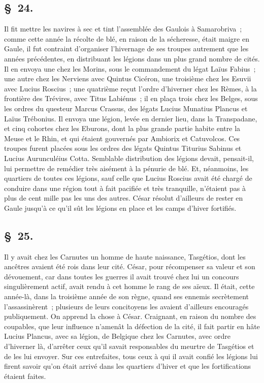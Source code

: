 \documentclass[french,twoside]{book} %
\begin{document}
\subsection[{§ 24.}]{ \textsc{§ 24.} }
\noindent Il fit mettre les navires à sec et tint l’assemblée des Gaulois à Samarobriva ; comme cette année la récolte de blé, en raison de la sécheresse, était maigre en Gaule, il fut contraint d’organiser l’hivernage de ses troupes autrement que les années précédentes, en distribuant les légions dans un plus grand nombre de cités. Il en envoya une chez les Morins, sous le commandement du légat Laïus Fabius ; une autre chez les Nerviens avec Quintus Cicéron, une troisième chez les Esuvii avec Lucius Roscius ; une quatrième reçut l’ordre d’hiverner chez les Rèmes, à la frontière des Trévires, avec Titus Labiénus ; il en plaça trois chez les Belges, sous les ordres du questeur Marcus Crassus, des légats Lucius Munatius Plancus et Laïus Trébonius. Il envoya une légion, levée en dernier lieu, dans la Transpadane, et cinq cohortes chez les Eburons, dont la plus grande partie habite entre la Meuse et le Rhin, et qui étaient gouvernés par Ambiorix et Catuvolcos. Ces troupes furent placées sous les ordres des légats Quintus Titurius Sabinus et Lucius Aurunculéius Cotta. Semblable distribution des légions devait, pensait-il, lui permettre de remédier très aisément à la pénurie de blé. Et, néanmoins, les quartiers de toutes ces légions, sauf celle que Lucius Roscius avait été chargé de conduire dans une région tout à fait pacifiée et très tranquille, n’étaient pas à plus de cent mille pas les uns des autres. César résolut d’ailleurs de rester en Gaule jusqu’à ce qu’il sût les légions en place et les camps d’hiver fortifiés.
\subsection[{§ 25.}]{ \textsc{§ 25.} }
\noindent Il y avait chez les Carnutes un homme de haute naissance, Tasgétios, dont les ancêtres avaient été rois dans leur cité. César, pour récompenser sa valeur et son dévouement, car dans toutes les guerres il avait trouvé chez lui un concours singulièrement actif, avait rendu à cet homme le rang de ses aïeux. Il était, cette année-là, dans la troisième année de son règne, quand ses ennemis secrètement l’assassinèrent ; plusieurs de leurs concitoyens les avaient d’ailleurs encouragés publiquement. On apprend la chose à César. Craignant, en raison du nombre des coupables, que leur influence n’amenât la défection de la cité, il fait partir en hâte Lucius Plancus, avec sa légion, de Belgique chez les Carnutes, avec ordre d’hiverner là, d’arrêter ceux qu’il savait responsables du meurtre de Tasgétios et de les lui envoyer. Sur ces entrefaites, tous ceux à qui il avait confié les légions lui firent savoir qu’on était arrivé dans les quartiers d’hiver et que les fortifications étaient faites.
\end{document}
